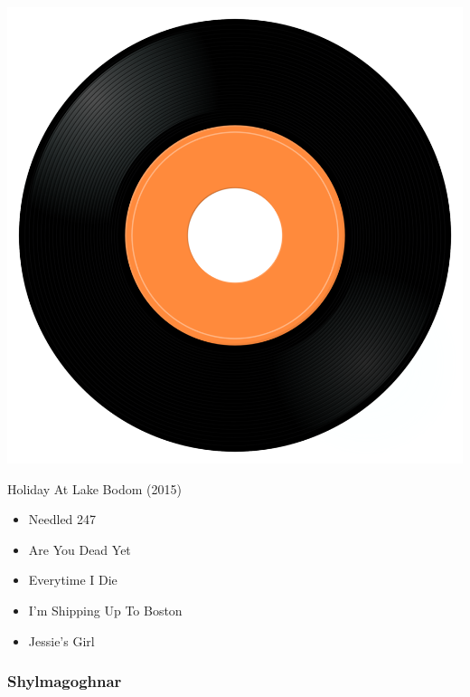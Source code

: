 \begin{minipage}[t]{0.25\textwidth}\vspace{0pt}
\captionsetup{type=figure}
\includegraphics[width=\textwidth]{Images/cover.png}
\caption*{Holiday At Lake Bodom (2015)}
\end{minipage}
\begin{minipage}[t]{0.25\textwidth}\vspace{0pt}
\begin{itemize}[nosep,leftmargin=1em,labelwidth=*,align=left]
	\setlength{\itemsep}{0pt}
	\item Needled 24\/7
	\item Are You Dead Yet
	\item Everytime I Die
	\item I'm Shipping Up To Boston
	\item Jessie's Girl
\end{itemize}
\end{minipage}

\subsubsection{Shylmagoghnar}

